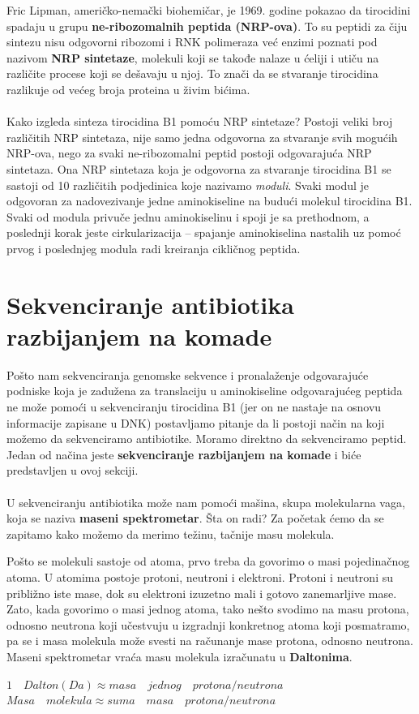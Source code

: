 Fric Lipman, američko-nemački biohemičar, je 1969. godine  pokazao da tirocidini spadaju u grupu \textbf{ne-ribozomalnih peptida (NRP-ova)}. To su peptidi za čiju sintezu nisu odgovorni ribozomi i RNK polimeraza već enzimi poznati pod nazivom \textbf{NRP sintetaze}, molekuli koji se takođe nalaze u ćeliji i utiču na različite procese koji se dešavaju u njoj. To znači da se stvaranje tirocidina razlikuje od većeg broja proteina u živim bićima. 
\\\\
\indent Kako izgleda sinteza tirocidina B1 pomoću NRP sintetaze? Postoji veliki broj različitih NRP sintetaza, nije samo jedna odgovorna za stvaranje svih mogućih NRP-ova, nego za svaki ne-ribozomalni peptid postoji odgovarajuća NRP sintetaza. Ona NRP sintetaza koja je odgovorna za stvaranje tirocidina B1 se sastoji od 10 različitih podjedinica koje nazivamo \textit{moduli}. Svaki modul je odgovoran za nadovezivanje jedne aminokiseline na budući molekul tirocidina B1. Svaki od modula privuče jednu aminokiselinu i spoji je sa prethodnom, a poslednji korak jeste cirkularizacija -- spajanje aminokiselina nastalih uz pomoć prvog i poslednjeg modula radi kreiranja cikličnog peptida.

\section{Sekvenciranje antibiotika razbijanjem na komade}

Pošto nam sekvenciranja genomske sekvence i pronalaženje odgovarajuće podniske koja je zadužena za translaciju u aminokiseline odgovarajućeg peptida ne može pomoći u sekvenciranju tirocidina B1 (jer on ne nastaje na osnovu informacije zapisane u DNK) postavljamo pitanje da li postoji način na koji možemo da sekvenciramo antibiotike. Moramo direktno da sekvenciramo peptid. Jedan od načina jeste \textbf{sekvenciranje razbijanjem na komade} i biće predstavljen u ovoj sekciji.
\\\\

\indent U sekvenciranju antibiotika može nam pomoći mašina, skupa molekularna vaga, koja se naziva \textbf{maseni spektrometar}. Šta on radi? Za početak ćemo da se zapitamo kako možemo da merimo težinu, tačnije masu molekula. 

Pošto se molekuli sastoje od atoma, prvo treba da govorimo o masi pojedinačnog atoma. U atomima postoje protoni, neutroni i elektroni. Protoni i neutroni su približno iste mase, dok su elektroni izuzetno mali i gotovo zanemarljive mase. Zato, kada govorimo o masi jednog atoma, tako nešto  svodimo na masu protona, odnosno neutrona koji učestvuju u izgradnji konkretnog atoma koji posmatramo, pa se i masa molekula može svesti na računanje mase protona, odnosno neutrona. Maseni spektrometar vraća masu molekula izračunatu u \textbf{Daltonima}. 
\begin{center}
$1 \quad Dalton (Da) \approx masa \quad jednog \quad protona/neutrona$ \\
$Masa \quad molekula \approx suma \quad masa \quad protona/neutrona$
\end{center}

